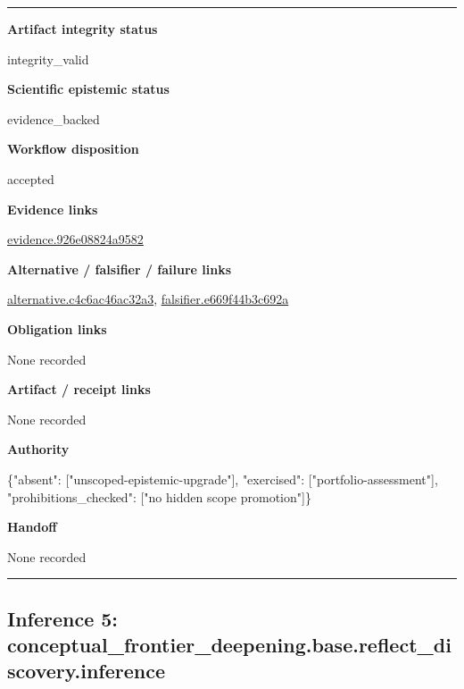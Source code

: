 \documentclass[10pt,a4paper]{article}
\newcommand{\TraceField}[2]{\par\noindent\textbf{#1}\par\noindent #2\par\smallskip}
\newenvironment{TraceDossier}{\par\medskip\noindent\hrule\medskip}{\medskip\hrule\par\medskip}
\begin{document}
\begin{TraceDossier}
\TraceField{Artifact integrity status}{integrity\_\allowbreak{}valid}

\TraceField{Scientific epistemic status}{evidence\_\allowbreak{}backed}

\TraceField{Workflow disposition}{accepted}

\TraceField{Evidence links}{\hyperlink{trace-evidence-b402b662eb7f28c685}{evidence.\allowbreak{}926e08824a\allowbreak{}9582}}

\TraceField{Alternative / falsifier / failure links}{\hyperlink{trace-alternative-2c3bc077f5dba604c1}{alternativ\allowbreak{}e.\allowbreak{}c4c6ac46ac\allowbreak{}32a3}, \hyperlink{trace-alternative-394299ed7e50caa7ed}{falsifier.\allowbreak{}e669f44b3c\allowbreak{}692a}}

\TraceField{Obligation links}{None recorded}

\TraceField{Artifact / receipt links}{None recorded}

\TraceField{Authority}{\{"absent":\allowbreak{} ["unscoped\allowbreak{}-\allowbreak{}epistemic-\allowbreak{}upgrade"],\allowbreak{} "exercised\allowbreak{}":\allowbreak{} ["portfoli\allowbreak{}o-\allowbreak{}assessment\allowbreak{}"], "prohibiti\allowbreak{}ons\_\allowbreak{}checked":\allowbreak{} ["no hidden scope promotion"\allowbreak{}]\}}

\TraceField{Handoff}{None recorded}

\end{TraceDossier}
\pagebreak[2]\subsection{Inference 5: conceptual\allowbreak{}\_\allowbreak{}frontier\_\allowbreak{}deepening.\allowbreak{}base.\allowbreak{}reflect\_\allowbreak{}discovery.\allowbreak{}inference}\label{trace-inference-f12096ebf9cfbe9ab1}
\end{document}
